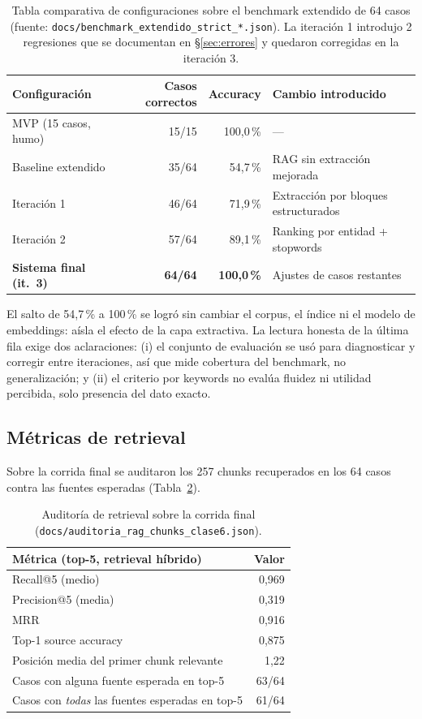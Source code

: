 \documentclass[11pt,a4paper]{article}
\newcommand{\code}[1]{\texttt{#1}}
\begin{document}
\begin{table}[H]
\centering
\begin{tabular}{lrrl}
\toprule
\textbf{Configuración} & \textbf{Casos correctos} & \textbf{Accuracy} & \textbf{Cambio introducido} \\
\midrule
MVP (15 casos, humo) & 15/15 & 100{,}0\,\% & --- \\
\midrule
Baseline extendido & 35/64 & 54{,}7\,\% & RAG sin extracción mejorada \\
Iteración 1 & 46/64 & 71{,}9\,\% & Extracción por bloques estructurados \\
Iteración 2 & 57/64 & 89{,}1\,\% & Ranking por entidad + stopwords \\
\textbf{Sistema final (it.\ 3)} & \textbf{64/64} & \textbf{100{,}0\,\%} & Ajustes de casos restantes \\
\bottomrule
\end{tabular}
\caption{Tabla comparativa de configuraciones sobre el benchmark extendido de
64 casos (fuente: \code{docs/benchmark\_extendido\_strict\_*.json}). La
iteración 1 introdujo 2 regresiones que se documentan en
§\ref{sec:errores} y quedaron corregidas en la iteración 3.}
\label{tab:comparativa}
\end{table}

El salto de 54{,}7\,\% a 100\,\% se logró sin cambiar el corpus, el índice ni
el modelo de embeddings: aísla el efecto de la capa extractiva. La lectura
honesta de la última fila exige dos aclaraciones: (i) el conjunto de
evaluación se usó para diagnosticar y corregir entre iteraciones, así que
mide cobertura del benchmark, no generalización; y (ii) el criterio por
keywords no evalúa fluidez ni utilidad percibida, solo presencia del dato
exacto.

\subsection{Métricas de retrieval}\label{sec:retrieval}

Sobre la corrida final se auditaron los 257 chunks recuperados en los 64
casos contra las fuentes esperadas (Tabla~\ref{tab:retrieval}).

\begin{table}[H]
\centering
\begin{tabular}{lr}
\toprule
\textbf{Métrica (top-5, retrieval híbrido)} & \textbf{Valor} \\
\midrule
Recall@5 (medio) & 0{,}969 \\
Precision@5 (media) & 0{,}319 \\
MRR & 0{,}916 \\
Top-1 source accuracy & 0{,}875 \\
Posición media del primer chunk relevante & 1{,}22 \\
Casos con alguna fuente esperada en top-5 & 63/64 \\
Casos con \emph{todas} las fuentes esperadas en top-5 & 61/64 \\
\bottomrule
\end{tabular}
\caption{Auditoría de retrieval sobre la corrida final
(\code{docs/auditoria\_rag\_chunks\_clase6.json}).}
\label{tab:retrieval}
\end{table}
\end{document}
